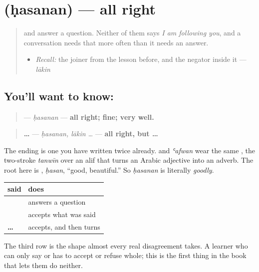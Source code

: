 \section[\texorpdfstring{\ar{حسنًا} (ḥasanan)}{حسنًا (ḥasanan)}]{ (ḥasanan) — all right}

\label{lesson:AR-C38-hasanan}



\begin{quote}
\textbf{} and \textbf{} answer a question. Neither of them says \emph{I am following you}, and a conversation needs that more often than it needs an answer.

\begin{itemize}
\raggedright
  \item \emph{Recall:} the joiner from the lesson before, and the negator inside it — \emph{lākin}
\end{itemize}
\end{quote}

\subsection*{You'll want to know: }
\begin{quote}
\textbf{} — \emph{ḥasanan} — \textbf{all right; fine; very well.}
\end{quote}

\begin{quote}
\textbf{  …} — \emph{ḥasanan, lākin …} — \textbf{all right, but …}
\end{quote}

The ending is one you have written twice already. \textbf{} and \emph{ʿafwan} wear the same \textbf{}, the two-stroke \emph{tanwīn} over an alif that turns an Arabic adjective into an adverb. The root here is \textbf{}, \emph{ḥasan}, \textquotedblleft{}good, beautiful.\textquotedblright{} So \emph{ḥasanan} is literally \emph{goodly}.

\begin{grammarlens}[title={Grammar Lens: agreeing, and half-agreeing}]
\noindent
\begin{tabularx}{\linewidth}{@{}>{\raggedright\arraybackslash}X>{\raggedright\arraybackslash}X@{}}
\toprule
\textbf{said} & \textbf{does} \\
\midrule
\textbf{\ar{نعم}} & answers a question \\
\textbf{\ar{حسنًا}} & accepts what was said \\
\textbf{\ar{حسنًا،} \ar{لكن} …} & accepts, and then turns \\
\bottomrule
\end{tabularx}

The third row is the shape almost every real disagreement takes. A learner who can only say \textbf{} or \textbf{} has to accept or refuse whole; this is the first thing in the book that lets them do neither.
\end{grammarlens}

